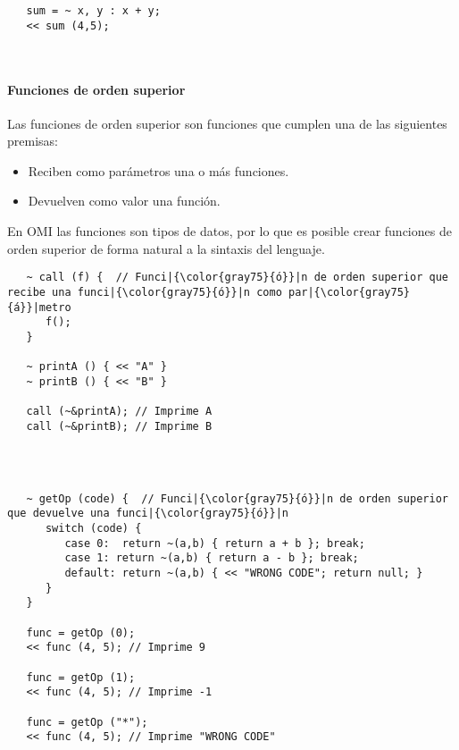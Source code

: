 \begin{lstlisting} 
   sum = ~ x, y : x + y;
   << sum (4,5); 
\end{lstlisting}
\hfill\\ 

\paragraph{Funciones de orden superior}

Las funciones de orden superior son funciones que cumplen una de las siguientes premisas:

\begin{itemize}
\item Reciben como parámetros una o más funciones.
\item Devuelven como valor una función.
\end{itemize}

En OMI las funciones son tipos de datos, por lo que es posible crear funciones de orden superior de
forma natural a la sintaxis del lenguaje. \\

\begin{lstlisting}
   ~ call (f) {  // Funci|{\color{gray75}{ó}}|n de orden superior que recibe una funci|{\color{gray75}{ó}}|n como par|{\color{gray75}{á}}|metro
      f();
   }
   
   ~ printA () { << "A" }
   ~ printB () { << "B" }
   
   call (~&printA); // Imprime A
   call (~&printB); // Imprime B
   
\end{lstlisting}
\hfill\\ 


\begin{lstlisting}
   ~ getOp (code) {  // Funci|{\color{gray75}{ó}}|n de orden superior que devuelve una funci|{\color{gray75}{ó}}|n
      switch (code) {
         case 0:  return ~(a,b) { return a + b }; break;
         case 1: return ~(a,b) { return a - b }; break;
         default: return ~(a,b) { << "WRONG CODE"; return null; }
      }
   }
   
   func = getOp (0);
   << func (4, 5); // Imprime 9
   
   func = getOp (1);
   << func (4, 5); // Imprime -1
   
   func = getOp ("*");
   << func (4, 5); // Imprime "WRONG CODE"
   
\end{lstlisting}
\hfill\\ 

